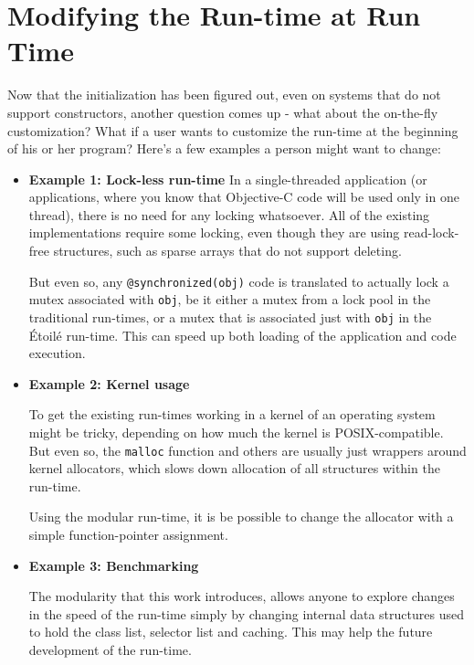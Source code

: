 \section{Modifying the Run-time at Run Time}

Now that the initialization has been figured out, even on systems that do not support constructors, another question comes up - what about the on-the-fly customization? What if a user wants to customize the run-time at the beginning of his or her program? Here's a few examples a person might want to change:

\begin{itemize}
\item{\bf{Example 1: Lock-less run-time}}
In a single-threaded application (or applications, where you know that Objective-C code will be used only in one thread), there is no need for any locking whatsoever. All of the existing implementations require some locking, even though they are using read-lock-free structures, such as sparse arrays that do not support deleting.

But even so, any \verb=@synchronized(obj)= code is translated to actually lock a mutex associated with \verb=obj=, be it either a mutex from a lock pool in the traditional run-times, or a mutex that is associated just with \verb=obj= in the \'Etoil\'e run-time. This can speed up both loading of the application and code execution.

\item{\bf{Example 2: Kernel usage}}

To get the existing run-times working in a kernel of an operating system might be tricky, depending on how much the kernel is POSIX-compatible. But even so, the \verb=malloc= function and others are usually just wrappers around kernel allocators, which slows down allocation of all structures within the run-time.

Using the modular run-time, it is be possible to change the allocator with a simple function-pointer assignment.

\item{\bf{Example 3: Benchmarking}}

The modularity that this work introduces, allows anyone to explore changes in the speed of the run-time simply by changing internal data structures used to hold the class list, selector list and caching. This may help the future development of the run-time.

\end{itemize}


